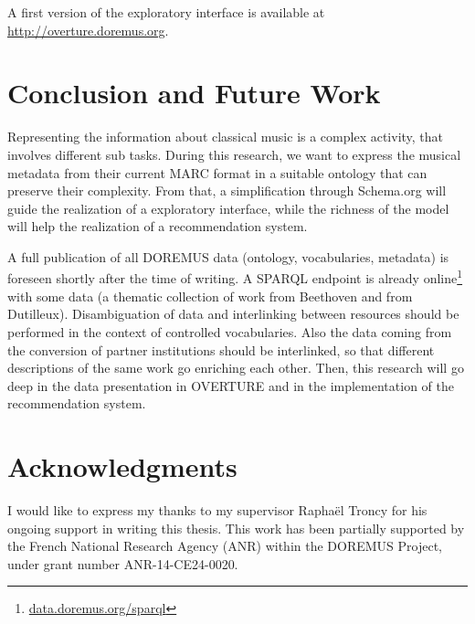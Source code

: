 \documentclass{llncs}
\begin{document}

A first version of the exploratory interface is available at \url{http://overture.doremus.org}.


\section{Conclusion and Future Work}
\label{sec:conclusion}
Representing the information about classical music is a complex activity, that involves different sub tasks. During this research, we want to express the musical metadata from their current MARC format in a suitable ontology that can preserve their complexity. From that, a simplification through Schema.org will guide the realization of a exploratory interface, while the richness of the model will help the realization of a recommendation system.

A full publication of all DOREMUS data (ontology, vocabularies, metadata) is foreseen shortly after the time of writing. A SPARQL endpoint is already online\footnote{\url{data.doremus.org/sparql}} with some data (a thematic collection of work from Beethoven and from Dutilleux). Disambiguation of data and interlinking between resources should be performed in the context of controlled vocabularies. Also the data coming from the conversion of partner institutions should be interlinked, so that different descriptions of the same work go enriching each other. Then, this research will go deep in the data presentation in OVERTURE and in the implementation of the recommendation system.

\section*{Acknowledgments}
I would like to express my thanks to my supervisor Rapha\"el Troncy for his ongoing support in writing this thesis. This work has been partially supported by the French National Research Agency (ANR) within the DOREMUS Project, under grant number ANR-14-CE24-0020.



\end{document}
